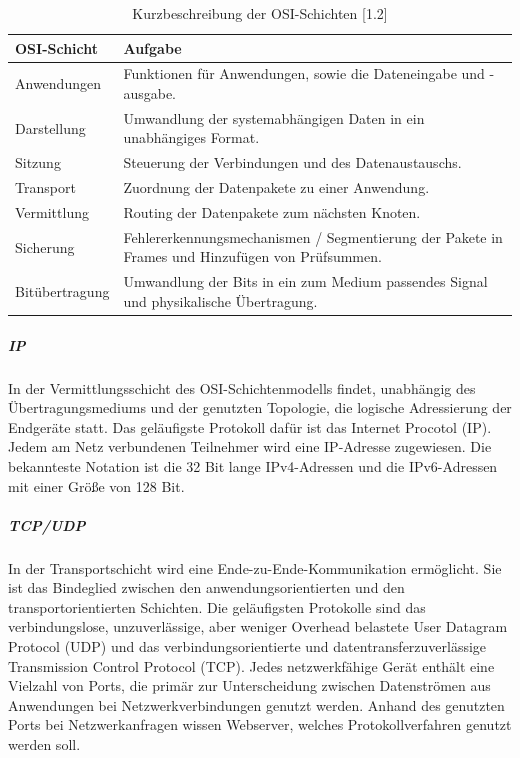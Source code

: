 \newpage

\begin{table}[]
\begin{center}
    \begin{tabular}{| l | p{8cm} |}
    \hline
     OSI-Schicht & Aufgabe \\ 
     \hline
        
       Anwendungen & Funktionen für Anwendungen, sowie die Dateneingabe und -ausgabe. \\
    \hline    
       Darstellung & Umwandlung der systemabhängigen Daten in ein unabhängiges Format.  \\
    \hline   
       Sitzung & Steuerung der Verbindungen und des Datenaustauschs.  \\
    \hline  
        Transport & Zuordnung der Datenpakete zu einer Anwendung. \\ 
    
    \hline     
    	Vermittlung & Routing der Datenpakete zum nächsten Knoten. \\
	
    \hline       
      Sicherung & Fehlererkennungsmechanismen / Segmentierung der Pakete in Frames und Hinzufügen von Prüfsummen.  \\   
    \hline
    
    Bitübertragung & Umwandlung der Bits in ein zum Medium passendes Signal und physikalische Übertragung.\\ 
    \hline    
    \end{tabular}
\end{center}
\caption{Kurzbeschreibung der OSI-Schichten [1.2]}
\end{table}

\subparagraph{IP}
In der Vermittlungsschicht des OSI-Schichtenmodells findet, unabhängig des Übertragungsmediums und der genutzten Topologie, die logische Adressierung der Endgeräte statt. Das geläufigste Protokoll dafür ist das Internet Procotol (IP). Jedem am Netz verbundenen Teilnehmer wird eine IP-Adresse zugewiesen. Die bekannteste Notation ist die 32 Bit lange IPv4-Adressen und die IPv6-Adressen mit einer Größe von 128 Bit. 
\newline

\subparagraph{TCP/UDP}
In der Transportschicht wird eine Ende-zu-Ende-Kommunikation ermöglicht. Sie ist das Bindeglied zwischen den anwendungsorientierten und den transportorientierten Schichten. Die geläufigsten Protokolle sind das verbindungslose, unzuverlässige, aber weniger Overhead belastete User Datagram Protocol (UDP) und das verbindungsorientierte und datentransferzuverlässige Transmission Control Protocol (TCP). Jedes netzwerkfähige Gerät enthält eine Vielzahl von Ports, die primär zur
Unterscheidung zwischen Datenströmen aus Anwendungen bei Netzwerkverbindungen
genutzt werden. Anhand des genutzten Ports bei Netzwerkanfragen
wissen Webserver, welches Protokollverfahren genutzt werden soll.

